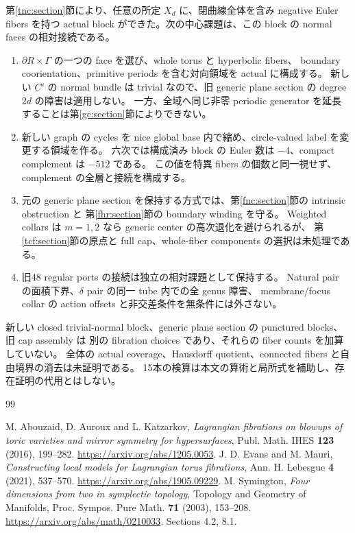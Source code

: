 \documentclass[11pt,a4paper]{article}
\theoremstyle{definition}
\begin{document}
第\ref{tnc:section}節により、任意の所定 $X_d$ に、閉曲線全体を含み negative Euler fibers を持つ
actual block ができた。次の中心課題は、この block の normal faces の相対接続である。

\begin{enumerate}
\item $\partial R\times\Gamma$ の一つの face を選び、whole torus と hyperbolic fibers、
boundary coorientation、primitive periods を含む対向領域を actual に構成する。
新しい $C'$ の normal bundle は trivial なので、旧 generic plane section の degree $2d$ の障害は適用しない。
一方、全域へ同じ非零 periodic generator を延長することは第\ref{gc:section}節によりできない。
\item 新しい graph の cycles を nice global base 内で縮め、circle-valued label を変更する領域を作る。
六次では構成済み block の Euler 数は $-4$、compact complement は $-512$ である。
この値を特異 fibers の個数と同一視せず、complement の全層と接続を構成する。
\item 元の generic plane section を保持する方式では、第\ref{fnc:section}節の intrinsic obstruction と
第\ref{fhr:section}節の boundary winding を守る。
Weighted collars は $m=1,2$ なら generic center の高次退化を避けられるが、
第\ref{tcf:section}節の原点と full cap、whole-fiber components の選択は未処理である。
\item 旧48 regular ports の接続は独立の相対課題として保持する。
Natural pair の面積下界、$\delta$ pair の同一 tube 内での全 genus 障害、
membrane/focus collar の action offsets と非交差条件を無条件には外さない。
\end{enumerate}

新しい closed trivial-normal block、generic plane section の punctured blocks、旧 cap assembly は
別の fibration choices であり、それらの fiber counts を加算していない。
全体の actual coverage、Hausdorff quotient、connected fibers と自由境界の消去は未証明である。
15本の検算は本文の算術と局所式を補助し、存在証明の代用とはしない。

\begin{thebibliography}{99}

M. Abouzaid, D. Auroux and L. Katzarkov,
\emph{Lagrangian fibrations on blowups of toric varieties and mirror symmetry for hypersurfaces},
Publ. Math. IHES \textbf{123} (2016), 199--282.
\url{https://arxiv.org/abs/1205.0053}.
J. D. Evans and M. Mauri,
\emph{Constructing local models for Lagrangian torus fibrations},
Ann. H. Lebesgue \textbf{4} (2021), 537--570.
\url{https://arxiv.org/abs/1905.09229}.
M. Symington,
\emph{Four dimensions from two in symplectic topology},
Topology and Geometry of Manifolds, Proc. Sympos. Pure Math. \textbf{71} (2003), 153--208.
\url{https://arxiv.org/abs/math/0210033}.
Sections 4.2, 8.1.
\end{thebibliography}
\end{document}
